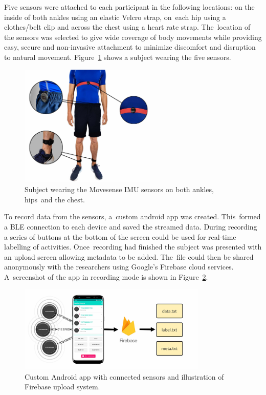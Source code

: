 Five sensors were attached to each participant in the following locations: on the inside of both ankles using an elastic Velcro strap, on~each hip using a clothes/belt clip and across the chest using a heart rate strap. The~location of the sensors was selected to give wide coverage of body movements while providing easy, secure and non-invasive attachment to minimize discomfort and disruption to natural movement. Figure~\ref{fig:movesense_sensors} shows a subject wearing the five sensors.

\begin{figure}[!hbt]
    \centering
    \includegraphics[height=220px]{content/4-LSTM_Behaviour/sensor_locations.jpg}
    \caption{Subject wearing the Movesense IMU sensors on both ankles, hips~and the chest.}
    \label{fig:movesense_sensors}
\end{figure}

To record data from the sensors, a~custom android app was created. This~formed a BLE connection to each device and saved the streamed data. During recording a series of buttons at the bottom of the screen could be used for real-time labelling of activities. Once~recording had finished the subject was presented with an upload screen allowing metadata to be added. The~file could then be shared anonymously with the researchers using Google's Firebase cloud services. A~screenshot of the app in recording mode is shown in Figure~\ref{fig:data_collection_diagrams}.

\begin{figure}[!hbt]
    \centering
    \includegraphics[width=0.8\textwidth]{content/4-LSTM_Behaviour/sensor_collection.jpg}
    \caption{Custom Android app with connected sensors and illustration of Firebase upload system.}
    \label{fig:data_collection_diagrams}
\end{figure}

